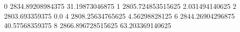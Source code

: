 0 2834.89208984375 31.19873046875
1 2805.724853515625 2.031494140625
2 2803.693359375 0.0
4 2808.25634765625 4.56298828125
6 2844.26904296875 40.57568359375
8 2866.896728515625 63.203369140625

